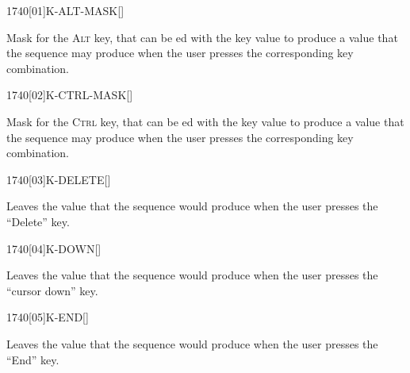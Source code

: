 
\vspace*{-2ex}
\begin{worddef}{1740}[01]{K-ALT-MASK}[]%
\item {}

	Mask for the \textsc{Alt} key, that can be ed with the
	key value to produce a value that the sequence 
	 may produce when the user presses the
	corresponding key combination.

\end{worddef}

\vspace*{-1ex}
\begin{worddef}{1740}[02]{K-CTRL-MASK}[]%
\item {}

	Mask for the \textsc{Ctrl} key, that can be ed with the
	key value to produce a value that the sequence 
	 may produce when the user presses the
	corresponding key combination.

\end{worddef}


\begin{worddef}{1740}[03]{K-DELETE}[]%
\item {}

	Leaves the value  that the sequence 
	 would produce when the user presses the
	``Delete'' key.

\end{worddef}


\begin{worddef}{1740}[04]{K-DOWN}[]%
\item {}

	Leaves the value  that the sequence 
	 would produce when the user presses the
	``cursor down'' key.

\end{worddef}


\begin{worddef}{1740}[05]{K-END}[]%
\item {}

	Leaves the value  that the sequence 
	 would produce when the user presses the
	``End'' key.

\end{worddef}


